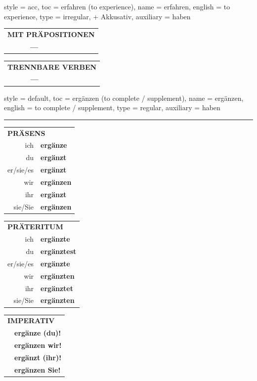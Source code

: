 \begin{verbentry}{
  style = {acc},
  toc = {erfahren (to experience)},
  name = {erfahren},
  english = {to experience},
  type = {irregular, + Akkusativ},
  auxiliary = {haben}
}
  
\vspace{10pt}

\begin{tabular}{lll}
\multicolumn{3}{l}{\textbf{MIT PRÄPOSITIONEN}}\\
& \textbf{---} & \\
\end{tabular}
\hfill
\begin{tabular}{lll}
\multicolumn{3}{l}{\textbf{TRENNBARE VERBEN}}\\
& \textbf{---} & \\
\end{tabular}
\vspace{-5pt}
\end{verbentry}

\begin{verbentry}{
  style = {default},
  toc = {ergänzen (to complete / supplement)},
  name = {ergänzen},
  english = {to complete / supplement},
  type = {regular},
  auxiliary = {haben}
}
 

\vspace{5pt}
\hrule
\vspace{5pt}

\begin{tabular}{rl}
\multicolumn{2}{l}{\textbf{PRÄSENS}}\\
ich & \textbf{ergänze}\\
du & \textbf{ergänzt}\\
er/sie/es & \textbf{ergänzt}\\
wir & \textbf{ergänzen}\\
ihr & \textbf{ergänzt}\\
sie/Sie & \textbf{ergänzen}\\
\end{tabular}
\hfill
\begin{tabular}{rl}
\multicolumn{2}{l}{\textbf{PRÄTERITUM}}\\
ich & \textbf{ergänzte}\\
du & \textbf{ergänztest}\\
er/sie/es & \textbf{ergänzte}\\
wir & \textbf{ergänzten}\\
ihr & \textbf{ergänztet}\\
sie/Sie & \textbf{ergänzten}\\
\end{tabular}
\hfill
\begin{tabular}{rl}
\multicolumn{2}{l}{\textbf{IMPERATIV}}\\
& \textbf{ergänze (du)!}\\
& \textbf{ergänzen wir!}\\
& \textbf{ergänzt (ihr)!}\\
& \textbf{ergänzen Sie!}\\
\end{tabular}


\end{verbentry}
